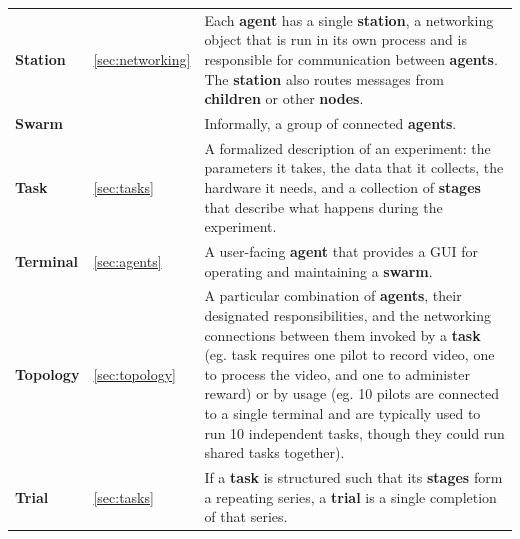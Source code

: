 \documentclass[nohyper, justified, notitlepage, marginals=raggedright,twoside=false,debug]{tufte-autopilot}
\begin{document}
\begin{fullwidth}
\begin{table}[!hb]
\begin{tabularx}{\linewidth}{llX}
 \textbf{Station} & \ref{sec:networking} & Each \textbf{agent} has a single \textbf{station}, a networking object that is run in its own process and is responsible for communication between \textbf{agents}. The \textbf{station} also routes messages from \textbf{children} or other \textbf{nodes}. \\
 \textbf{Swarm} & & Informally, a group of connected \textbf{agents}. \\
 \textbf{Task} & \ref{sec:tasks} & A formalized description of an experiment: the parameters it takes, the data that it collects, the hardware it needs, and a collection of \textbf{stages} that describe what happens during the experiment.  \\
 \textbf{Terminal} & \ref{sec:agents} & A user-facing \textbf{agent} that provides a GUI for operating and maintaining a \textbf{swarm}.  \\
\textbf{Topology} & \ref{sec:topology} & A particular combination of \textbf{agents}, their designated responsibilities, and the networking connections between them invoked by a \textbf{task} (eg. task requires one pilot to record video, one to process the video, and one to administer reward) or by usage (eg. 10 pilots are connected to a single terminal and are typically used to run 10 independent tasks, though they could run shared tasks together). \\
\textbf{Trial} & \ref{sec:tasks} & If a \textbf{task} is structured such that its \textbf{stages} form a repeating series, a \textbf{trial} is a single completion of that series.%
\end{tabularx}%
\end{table}%
\end{fullwidth}
%
\backmatter
\begin{fullwidth}



\end{fullwidth}
\end{document}
